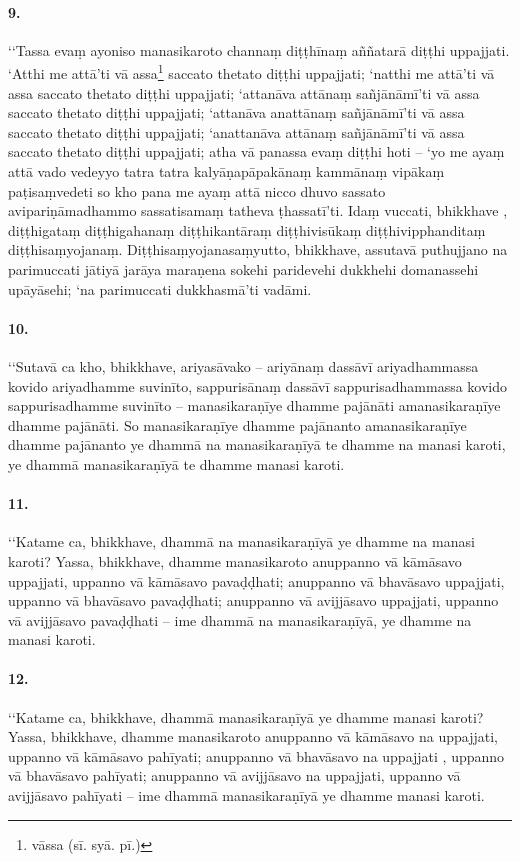 \paragraph{9.} ‘‘Tassa evaṃ ayoniso manasikaroto channaṃ diṭṭhīnaṃ aññatarā diṭṭhi uppajjati. ‘Atthi me attā’ti vā assa\footnote{vāssa (sī. syā. pī.)} saccato thetato diṭṭhi uppajjati; ‘natthi me attā’ti vā assa saccato thetato diṭṭhi uppajjati; ‘attanāva attānaṃ sañjānāmī’ti vā assa saccato thetato diṭṭhi uppajjati; ‘attanāva anattānaṃ sañjānāmī’ti vā assa saccato thetato diṭṭhi uppajjati; ‘anattanāva attānaṃ sañjānāmī’ti vā assa saccato thetato diṭṭhi uppajjati; atha vā panassa evaṃ diṭṭhi hoti – ‘yo me ayaṃ attā vado vedeyyo tatra tatra kalyāṇapāpakānaṃ kammānaṃ vipākaṃ paṭisaṃvedeti so kho pana me ayaṃ attā nicco dhuvo sassato avipariṇāmadhammo sassatisamaṃ tatheva ṭhassatī’ti. Idaṃ vuccati, bhikkhave , diṭṭhigataṃ diṭṭhigahanaṃ diṭṭhikantāraṃ diṭṭhivisūkaṃ diṭṭhivipphanditaṃ diṭṭhisaṃyojanaṃ. Diṭṭhisaṃyojanasaṃyutto, bhikkhave, assutavā puthujjano na parimuccati jātiyā jarāya maraṇena sokehi paridevehi dukkhehi domanassehi upāyāsehi; ‘na parimuccati dukkhasmā’ti vadāmi.

\paragraph{10.} ‘‘Sutavā ca kho, bhikkhave, ariyasāvako – ariyānaṃ dassāvī ariyadhammassa kovido ariyadhamme suvinīto, sappurisānaṃ dassāvī sappurisadhammassa kovido sappurisadhamme suvinīto – manasikaraṇīye dhamme pajānāti amanasikaraṇīye dhamme pajānāti. So manasikaraṇīye dhamme pajānanto amanasikaraṇīye dhamme pajānanto ye dhammā na manasikaraṇīyā te dhamme na manasi karoti, ye dhammā manasikaraṇīyā te dhamme manasi karoti.

\paragraph{11.} ‘‘Katame ca, bhikkhave, dhammā na manasikaraṇīyā ye dhamme na manasi karoti? Yassa, bhikkhave, dhamme manasikaroto anuppanno vā kāmāsavo uppajjati, uppanno vā kāmāsavo pavaḍḍhati; anuppanno vā bhavāsavo uppajjati, uppanno vā bhavāsavo pavaḍḍhati; anuppanno vā avijjāsavo uppajjati, uppanno vā avijjāsavo pavaḍḍhati – ime dhammā na manasikaraṇīyā, ye dhamme na manasi karoti.

\paragraph{12.} ‘‘Katame ca, bhikkhave, dhammā manasikaraṇīyā ye dhamme manasi karoti? Yassa, bhikkhave, dhamme manasikaroto anuppanno vā kāmāsavo na uppajjati, uppanno vā kāmāsavo pahīyati; anuppanno vā bhavāsavo na uppajjati , uppanno vā bhavāsavo pahīyati; anuppanno vā avijjāsavo na uppajjati, uppanno vā avijjāsavo pahīyati – ime dhammā manasikaraṇīyā ye dhamme manasi karoti.

